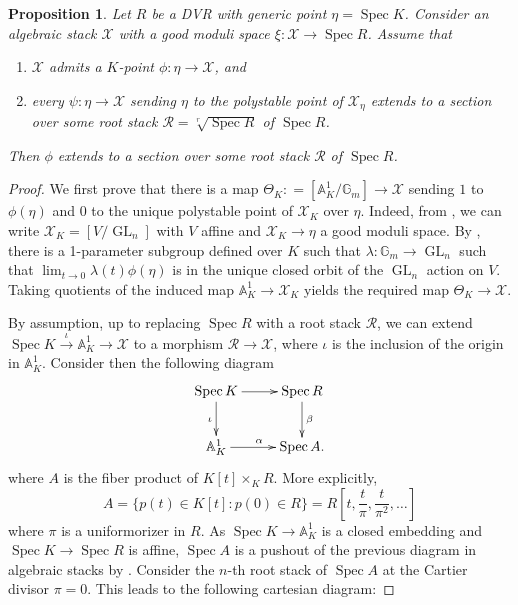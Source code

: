 \documentclass{amsart}
\newtheorem{proposition}[proposition]{Proposition}
\theoremstyle{definition}
\newcommand{\bA}{\mathbb{A}}
\newcommand{\cX}{\mathcal{X}}
\newcommand{\cR}{\mathcal{R}}
\DeclareMathOperator{\GL}{GL}
\newcommand{\spec}{\operatorname{Spec}}
\newcommand{\Gm}{\mathbb{G}_m}
\begin{document}
\begin{proposition}\label{prop_knowing_the_result_for_poli_pts_suffices}
Let $R$ be a DVR with generic point $\eta = \spec K$. Consider an algebraic stack $\cX$ with a good moduli space $\xi:\cX\to \spec R$. Assume that
\begin{enumerate}
\item $\cX$ admits a $K$-point $\phi:\eta\to \cX$, and 
\item every $\psi:\eta\to \cX$ sending $\eta$ to the polystable point of $\cX_\eta$ extends to a section over some root stack $\cR = \sqrt[r]{\spec R}$ of $\spec R$.
\end{enumerate}
Then $\phi$ extends to a section over some root stack $\cR$ of $\spec R$. 
\end{proposition}
\begin{proof}
We first prove that  there is a map $\Theta_K \colon = [\bA^1_{K}/\Gm]\to \cX$ sending $1$ to $\phi(\eta)$ and $0$ to the unique polystable point of $\cX_K$ over $\eta$. Indeed, from \cite[Theorem 6.1]{AHRetalelocal}, we can write $\cX_K = [V/\GL_n]$ with $V$ affine and $\cX_K \to \eta$ a good moduli space. By , there is a 1-parameter subgroup defined over $K$ such that $\lambda : \mathbb{G}_m \to \GL_n$ such that $\lim_{t \to 0}\lambda(t)\phi(\eta)$ is in the unique closed orbit of the $\GL_n$ action on $V$. Taking quotients of the induced map $\mathbb{A}^1_K \to \cX_K$ yields the required map $\Theta_K \to \cX$.



By assumption, up to replacing $\spec R$ with a root stack $\cR$, we can extend $\spec K\xrightarrow{\iota}\bA^1_{K}\to\cX$ to a morphism $\cR\to \cX$, where $\iota$ is the inclusion of the origin in $\bA^1_{K}$. Consider then the following diagram
\[
\xymatrix{\spec K\ar[r] \ar[d]_\iota & \spec R\ar[d]^\beta \\ \bA^1_{K}\ar[r]^\alpha & \spec A.}
\]
where $A$ is the fiber product of $K[t]\times_{K} R$. More explicitly, 
\[
A = \{p(t)\in K[t]:p(0)\in R\} = R\left[t, \frac{t}{\pi}, \frac{t}{\pi^2},\ldots\right] \]
where $\pi$ is a uniformorizer in $R$. As $\spec K\to \bA^1_{K}$ is a closed embedding and $\spec K\to\spec R$ is affine, $\spec A$ is a pushout of the previous diagram in algebraic stacks by \cite[Theorem 4.2]{alper2024artin}. Consider the $n$-th root stack of $\spec A$ at the Cartier divisor $\pi=0$. This leads to the following cartesian diagram:


\end{proof}
\end{document}
